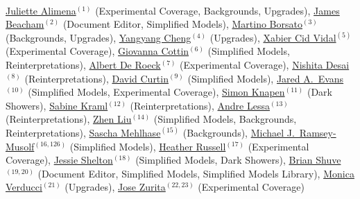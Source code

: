 \\

\noindent \href{mailto:juliette.alimena@cern.ch}{Juliette Alimena}$^{(1)}$ (Experimental Coverage, Backgrounds, Upgrades), \href{mailto:j.beacham@cern.ch}{James Beacham}$^{(2)}$ (Document Editor, Simplified Models), \href{mailto:martino.borsato@cern.ch}{Martino Borsato}$^{(3)}$ (Backgrounds, Upgrades), \href{mailto:yangyang.cheng@cornell.edu}{Yangyang Cheng}$^{(4)}$ (Upgrades), \href{mailto:xabier.cid.vidal@cern.ch}{Xabier Cid Vidal}$^{(5)}$ (Experimental Coverage), \href{mailto:gcottin@phys.ntu.edu.tw}{Giovanna Cottin}$^{(6)}$ (Simplified Models, Reinterpretations), \href{mailto:deroeck@mail.cern.ch}{Albert De Roeck}$^{(7)}$ (Experimental Coverage), \href{mailto:ddesai@theory.tifr.res.in}{Nishita Desai}$^{(8)}$ (Reinterpretations), \href{mailto:dcurtin@physics.utoronto.ca}{David Curtin}$^{(9)}$ (Simplified Models), \href{mailto:jaredaevans@gmail.com}{Jared A.~Evans}$^{(10)}$ (Simplified Models, Experimental Coverage), \href{mailto:knapen@ias.edu}{Simon Knapen}$^{(11)}$ (Dark Showers), \href{mailto:sabine.kraml@lpsc.in2p3.fr}{Sabine Kraml}$^{(12)}$ (Reinterpretations), \href{mailto:andre.lessa@ufabc.edu.br}{Andre Lessa}$^{(13)}$ (Reinterpretations), \href{mailto:zliuphys@umd.edu}{Zhen Liu}$^{(14)}$ (Simplified Models, Backgrounds, Reinterpretations), \href{mailto:sascha.mehlhase@cern.ch}{Sascha Mehlhase}$^{(15)}$ (Backgrounds), \href{mailto:mjrm@physics.umass.edu}{Michael J.~Ramsey-Musolf}$^{(16,126)}$ (Simplified Models), \href{mailto:hrussell@cern.ch}{Heather Russell}$^{(17)}$ (Experimental Coverage), \href{mailto:sheltonj@illinois.edu}{Jessie Shelton}$^{(18)}$ (Simplified Models, Dark Showers), \href{mailto:bshuve@g.hmc.edu}{Brian Shuve}$^{(19,20)}$ (Document Editor, Simplified Models, Simplified Models Library), \href{mailto:monica.verducci@cern.ch}{Monica Verducci}$^{(21)}$ (Upgrades), \href{mailto:jose.zurita@kit.edu}{Jose Zurita}$^{(22,23)}$ (Experimental Coverage)\\

\vspace{1.5cm}

\vspace{1.5cm}

\\

